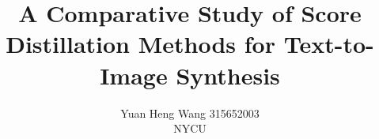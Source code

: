 \documentclass[10pt,twocolumn,letterpaper]{article}
\title{A Comparative Study of Score Distillation Methods for Text-to-Image Synthesis}
\author{Yuan Heng Wang 315652003\\NYCU}
\begin{document}





{
    \small
    
    
}
\end{document}
